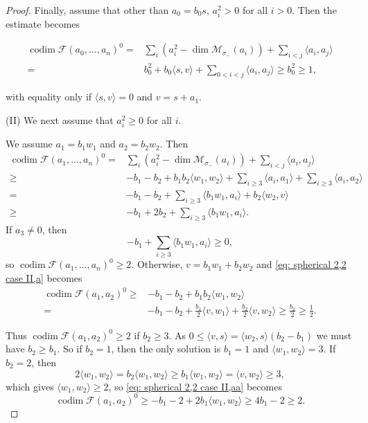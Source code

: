 \documentclass[leqno,11pt]{amsart}
\def\codim{\mathop{\mathrm{codim}}\nolimits}
\def\dim{\mathop{\mathrm{dim}}\nolimits}
\theoremstyle{definition}
\def\FF{\ensuremath{\mathcal F}}
\def\MM{\ensuremath{\mathcal M}}
\begin{document}
\begin{proof}
Finally, assume that other than $a_0=b_0 s$, $a_i^2>0$ for all $i>0$.  Then the estimate becomes 

\begin{equation}\label{eq: spherical 2,2 case I, d}
\begin{split}
\codim\FF(a_0,...,a_n)^0=&\sum_i (a_i^2-\dim \MM_{\sigma_-}(a_i))+\sum_{i<j}\langle a_i,a_j \rangle\\
= & b_0^2+b_0\langle s,v\rangle+\sum_{0<i<j}\langle a_i,a_j\rangle\geq b_0^2\geq 1,
\end{split}
\end{equation}

with equality only if $\langle s,v\rangle=0$ and $v=s+a_1$.  



(II) We next assume that $a_i^2 \geq 0$ for all $i$.
 

We assume $a_1=b_1 w_1$ and $a_2=b_2 w_2$.
Then 
 \begin{equation}\label{eq: spherical 2,2 case II,a}
\begin{split}
\codim\FF(a_1,...,a_n)^0=& \sum_i (a_i^2-\dim \MM_{\sigma_-}(a_i))+\sum_{i<j}\langle a_i,a_j \rangle\\
\geq &
-b_1-b_2+b_1 b_2 \langle w_1,w_2 \rangle
+\sum_{i \geq 3} \langle a_i,a_1\rangle+\sum_{i\geq 3}\langle a_i,a_2 \rangle\\
= & -b_1-b_2+\sum_{i\geq 3}\langle b_1w_1,a_i\rangle+b_2\langle w_2,v\rangle\\
\geq &
-b_1+2b_2+\sum_{i\geq 3}\langle b_1w_1,a_i\rangle.
\end{split}
\end{equation}
If $a_3\neq 0$, then $$-b_1+\sum_{i\geq 3}\langle b_1 w_1,a_i\rangle\geq 0,$$ so $\codim\FF(a_1,...,a_n)^0\geq 2$.  Otherwise, $v=b_1w_1+b_2w_2$ and \eqref{eq: spherical 2,2 case II,a} becomes 
\begin{equation}\label{eq: spherical 2,2 case II,aa}
\begin{split}
\codim\FF(a_1,a_2)^0\geq&-b_1-b_2+b_1b_2\langle w_1,w_2\rangle\\
=& -b_1-b_2+\frac{b_1}{2}\langle v,w_1\rangle+\frac{b_2}{2}\langle v,w_2\rangle\geq\frac{b_2}{2}\geq\frac{1}{2}.
\end{split}
\end{equation}

Thus $\codim\FF(a_1,a_2)^0\geq 2$ if $b_2\geq 3$.  As $0\leq\langle v,s\rangle=\langle w_2,s\rangle(b_2-b_1)$ we must have $b_2\geq b_1$.  So if $b_2=1$, then the only solution is $b_1=1$ and $\langle w_1,w_2\rangle=3$.  If $b_2=2$, then $$2\langle w_1,w_2\rangle=b_2\langle w_1,w_2\rangle\geq b_1\langle w_1,w_2\rangle=\langle v,w_2\rangle\geq 3,$$ which gives $\langle w_1,w_2\rangle\geq 2$, so \eqref{eq: spherical 2,2 case II,aa} becomes $$\codim\FF(a_1,a_2)^0\geq -b_1-2+2b_1\langle w_1,w_2\rangle\geq 4b_1-2\geq 2.$$



\end{proof}
\end{document}
